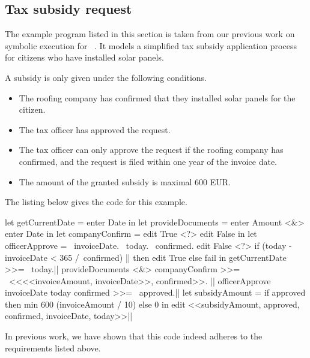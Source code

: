 \subsection{Tax subsidy request}

The example program listed in this section is taken from our previous work on symbolic execution for \TOPHAT~\cite{Steenvoorden2019}.
It models a simplified tax subsidy application process for citizens who have installed solar panels.

A subsidy is only given under the following conditions.
\begin{itemize}
\item The roofing company has confirmed that they installed solar panels for the citizen.
\item The tax officer has approved the request.
\item The tax officer can only approve the request if the roofing company has confirmed, and the request is filed within one year of the invoice date.
\item The amount of the granted subsidy is maximal 600 EUR.
\end{itemize}

The listing below gives the \TOPHAT code for this example.

\begin{TASK}[
    float=p,
    numbers=right,
    caption={Subsidy request and approval workflow at the Dutch tax office.},
    label=lst:tax]
  let getCurrentDate = enter Date in
  let provideDocuments = enter Amount <&> enter Date in
  let companyConfirm = edit True <?> edit False in
  let officerApprove = \ invoiceDate. \ today. \ confirmed.
    edit False <?> if (today - invoiceDate < 365 /\ confirmed) |\label{lst:tax:officer-approve-def}| then edit True else fail in
  getCurrentDate >>= \ today.|\label{lst:tax:citizen-info}|
  provideDocuments <&> companyConfirm >>= \ <<<<invoiceAmount, invoiceDate>>, confirmed>>. |\label{lst:tax:documents-and-company-confirm}|
  officerApprove invoiceDate today confirmed >>= \ approved.|\label{lst:tax:officer-approve}|
  let subsidyAmount = if approved then min 600 (invoiceAmount / 10) else 0 in
    edit <<subsidyAmount, approved, confirmed, invoiceDate, today>>|\label{lst:tax:result}|
\end{TASK}

In previous work, we have shown that this code indeed adheres to the requirements listed above.

